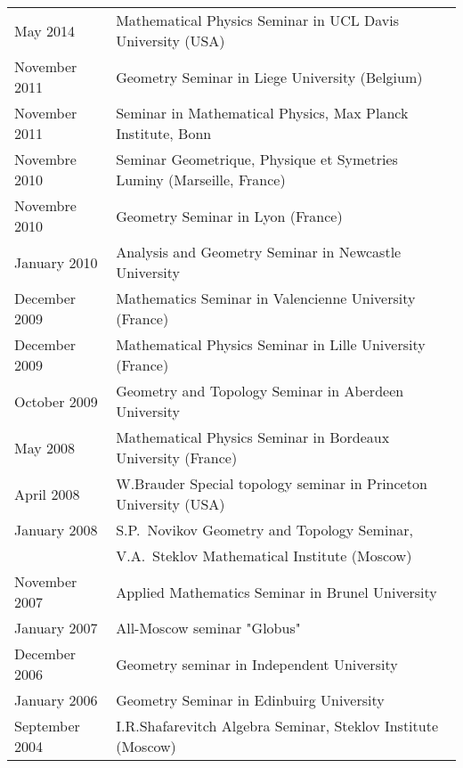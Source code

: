 \documentclass[12pt]{article}
\begin{document}
\begin{tabular}{ll}
 May  2014   &Mathematical Physics  Seminar in UCL Davis University (USA)\\
 
November 2011   &Geometry  Seminar in Liege University (Belgium)\\

November 2011   &Seminar in Mathematical Physics, Max Planck Institute, 
                      Bonn \\


 Novembre 2010   &Seminar Geometrique, Physique et Symetries
              Luminy (Marseille, France)\\
 
   Novembre  2010   &Geometry  Seminar in Lyon (France)\\
 
January 2010   &Analysis and Geometry  Seminar in Newcastle University\\

December 2009   &Mathematics Seminar in Valencienne University (France)\\

December 2009   &Mathematical Physics Seminar in Lille University (France)\\

October 2009   &Geometry and Topology  Seminar in Aberdeen University\\

May 2008   &Mathematical Physics Seminar in Bordeaux University (France)\\

April 2008   &W.Brauder Special topology seminar in Princeton University (USA)\\

January 2008 & S.P.~Novikov Geometry and Topology Seminar,\\
   &  V.A.~Steklov
 Mathematical Institute (Moscow)\\

November 2007   &Applied Mathematics  Seminar in Brunel University\\

January 2007  &All-Moscow seminar "Globus"\\

December 2006  &Geometry seminar in Independent University\\

 January 2006   &Geometry Seminar in Edinbuirg University \\


 September 2004   &I.R.Shafarevitch Algebra  Seminar, Steklov Institute (Moscow)\\


\end{tabular}
\end{document}
